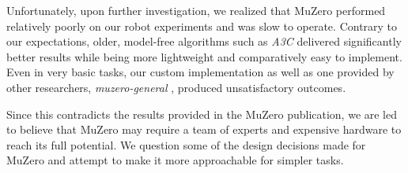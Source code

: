 Unfortunately, upon further investigation, we realized that MuZero performed relatively poorly on our robot experiments and was slow to operate. Contrary to our expectations, older, model-free algorithms such as \textit{A3C} \cite{a3c} delivered significantly better results while being more lightweight and comparatively easy to implement. Even in very basic tasks, our custom implementation as well as one provided by other researchers, \textit{muzero-general} \cite{muzero-general}, produced unsatisfactory outcomes.

Since this contradicts the results provided in the MuZero publication, we are led to believe that MuZero may require a team of experts and expensive hardware to reach its full potential. We question some of the design decisions made for MuZero and attempt to make it more approachable for simpler tasks.